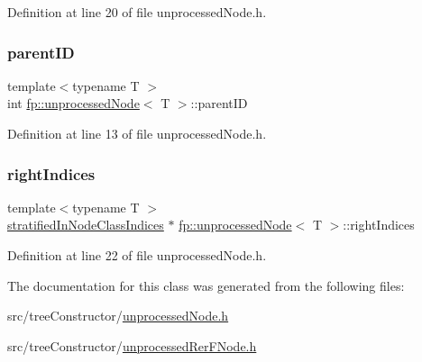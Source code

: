 Definition at line 20 of file unprocessed\+Node.\+h.

\mbox{\label{classfp_1_1unprocessedNode_a74cb75f76c24622444e531a583b75c3d}} 
\subsubsection{\texorpdfstring{parent\+ID}{parentID}}
{\footnotesize\ttfamily template$<$typename T $>$ \\
int \hyperlink{classfp_1_1unprocessedNode}{fp\+::unprocessed\+Node}$<$ T $>$\+::parent\+ID\hspace{0.3cm}{\ttfamily [protected]}}



Definition at line 13 of file unprocessed\+Node.\+h.

\mbox{\label{classfp_1_1unprocessedNode_ac6886f626536370b1276374d4939291e}} 
\subsubsection{\texorpdfstring{right\+Indices}{rightIndices}}
{\footnotesize\ttfamily template$<$typename T $>$ \\
\hyperlink{classfp_1_1stratifiedInNodeClassIndices}{stratified\+In\+Node\+Class\+Indices} $\ast$ \hyperlink{classfp_1_1unprocessedNode}{fp\+::unprocessed\+Node}$<$ T $>$\+::right\+Indices\hspace{0.3cm}{\ttfamily [protected]}}



Definition at line 22 of file unprocessed\+Node.\+h.



The documentation for this class was generated from the following files\+:\begin{DoxyCompactItemize}
\item 
src/tree\+Constructor/\hyperlink{unprocessedNode_8h}{unprocessed\+Node.\+h}\item 
src/tree\+Constructor/\hyperlink{treeConstructor_2unprocessedRerFNode_8h}{unprocessed\+Rer\+F\+Node.\+h}\end{DoxyCompactItemize}
